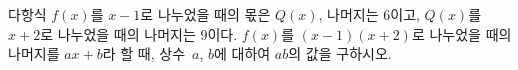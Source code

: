 다항식 $f(x)$를 $x-1$로 나누었을 때의 몫은 $Q(x)$, 나머지는 $6$이고, $Q(x)$를 $x+2$로 나누었을 때의 나머지는 $9$이다. $f(x)$를 $(x-1)(x+2)$로 나누었을 때의 나머지를 $ax+b$라 할 때, 상수~$a$, $b$에 대하여 $ab$의 값을 구하시오.
